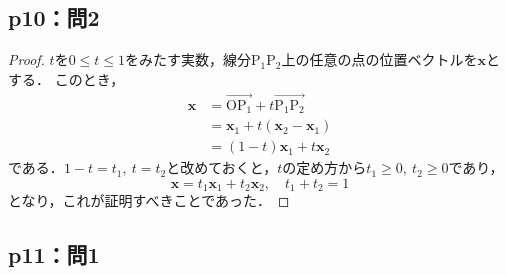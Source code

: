 \documentclass[uplatex,dvipdfmx,a4paper,10pt,fleqn]{jsarticle}
\begin{document}
\subsection*{p10：問2}

\begin{tleftbar}
    \begin{proof}
        $t$を$0 \le t \le 1$をみたす実数，線分$\mathrm{P_1 P_2}$上の任意の点の位置ベクトルを$\bm{x}$とする．
        このとき，
        \begin{align*}
            \bm{x} & = \overrightarrow{\mathrm{O P_1}}+t\overrightarrow{\mathrm{P_1 P_2}} \\
            & = \bm{x}_1 + t (\bm{x}_2 - \bm{x}_1) \\
             &= (1-t) \bm{x}_1 + t \bm{x}_2
        \end{align*}
        である．$1-t = t_1,~t=t_2$と改めておくと，$t$の定め方から$t_1 \ge 0,~t_2 \ge 0$であり，
        \[
            \bm{x}= t_1 \bm{x}_1 + t_2 \bm{x}_2 ,\quad t_1 + t_2 =1
        \]
        となり，これが証明すべきことであった．
    \end{proof}
\end{tleftbar}

\newpage
\subsection*{p11：問1}
\end{document}
